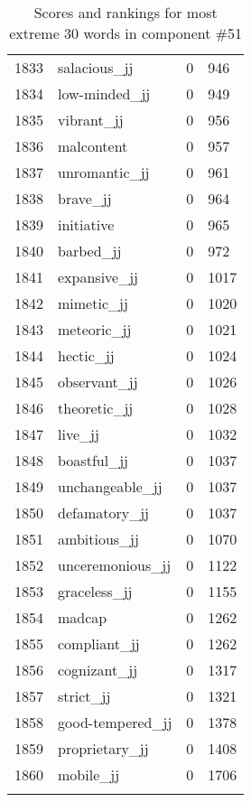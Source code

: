 \begin{longtable}[!htbp]{| rlr@{.}l |}
    1833 & salacious\_jj & 0 & 946 \\
    1834 & low-minded\_jj & 0 & 949 \\
    1835 & vibrant\_jj & 0 & 956 \\
    1836 & malcontent & 0 & 957 \\
    1837 & unromantic\_jj & 0 & 961 \\
    1838 & brave\_jj & 0 & 964 \\
    1839 & initiative & 0 & 965 \\
    1840 & barbed\_jj & 0 & 972 \\
    1841 & expansive\_jj & 0 & 1017 \\
    1842 & mimetic\_jj & 0 & 1020 \\
    1843 & meteoric\_jj & 0 & 1021 \\
    1844 & hectic\_jj & 0 & 1024 \\
    1845 & observant\_jj & 0 & 1026 \\
    1846 & theoretic\_jj & 0 & 1028 \\
    1847 & live\_jj & 0 & 1032 \\
    1848 & boastful\_jj & 0 & 1037 \\
    1849 & unchangeable\_jj & 0 & 1037 \\
    1850 & defamatory\_jj & 0 & 1037 \\
    1851 & ambitious\_jj & 0 & 1070 \\
    1852 & unceremonious\_jj & 0 & 1122 \\
    1853 & graceless\_jj & 0 & 1155 \\
    1854 & madcap & 0 & 1262 \\
    1855 & compliant\_jj & 0 & 1262 \\
    1856 & cognizant\_jj & 0 & 1317 \\
    1857 & strict\_jj & 0 & 1321 \\
    1858 & good-tempered\_jj & 0 & 1378 \\
    1859 & proprietary\_jj & 0 & 1408 \\
    1860 & mobile\_jj & 0 & 1706 \\
    \hline
    \caption{Scores and rankings for most extreme 30 words in component \#51} \\
\end{longtable}
